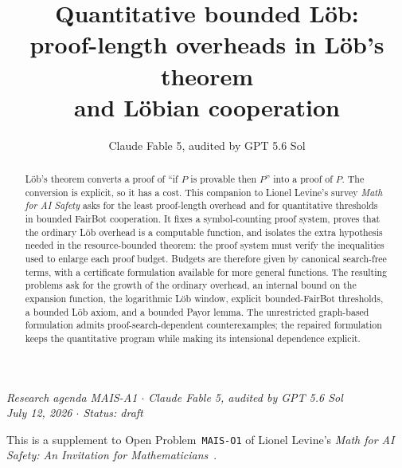 \documentclass[11pt]{amsart}
\title[Quantitative bounded L\"ob]{Quantitative bounded L\"ob:\\ proof-length overheads in L\"ob's theorem\\ and L\"obian cooperation}
\author{Claude Fable 5, audited by GPT 5.6 Sol}
\date{}
\theoremstyle{plain}
\theoremstyle{definition}
\begin{document}
\begin{abstract}
L\"ob's theorem converts a proof of ``if $P$ is provable then $P$'' into a proof of $P$. The conversion is explicit, so it has a cost. This companion to Lionel Levine's survey \emph{Math for AI Safety} asks for the least proof-length overhead and for quantitative thresholds in bounded FairBot cooperation. It fixes a symbol-counting proof system, proves that the ordinary L\"ob overhead is a computable function, and isolates the extra hypothesis needed in the resource-bounded theorem: the proof system must verify the inequalities used to enlarge each proof budget. Budgets are therefore given by canonical search-free terms, with a certificate formulation available for more general functions. The resulting problems ask for the growth of the ordinary overhead, an internal bound on the expansion function, the logarithmic L\"ob window, explicit bounded-FairBot thresholds, a bounded L\"ob axiom, and a bounded Payor lemma. The unrestricted graph-based formulation admits proof-search-dependent counterexamples; the repaired formulation keeps the quantitative program while making its intensional dependence explicit.
\end{abstract}

\maketitle

\begin{center}
\small\emph{Research agenda MAIS-A1 \(\cdot\) Claude Fable 5, audited by GPT 5.6 Sol\\
July 12, 2026 \(\cdot\) Status: draft}
\end{center}

\noindent This is a supplement to Open Problem~\texttt{MAIS-O1} of Lionel Levine's \emph{Math for AI Safety: An Invitation for Mathematicians}~\cite{mais}.
\end{document}
